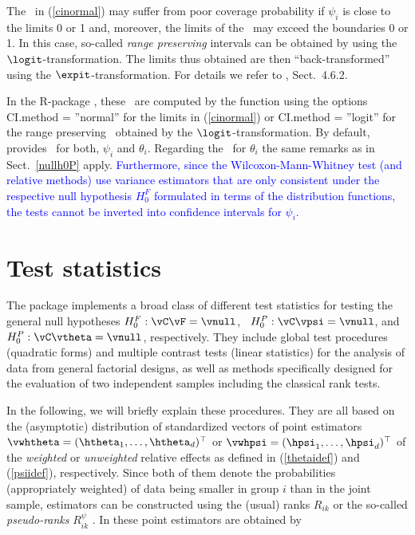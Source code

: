 The \cis\ in (\ref{cinormal}) may suffer from poor coverage probability if $\psi_i$ 
is close to the limits 0 or 1 and, moreover, the limits of the \ci\ may exceed 
the boundaries 0 or 1. In this case, so-called {\it range preserving} intervals 
can be obtained by using the $\logit$-transformation. The limits thus obtained 
are then ``back-transformed'' using the $\expit$-transformation. For details we 
refer to \cite{brunner2019rank}, Sect.~4.6.2.

In the R-package , these \cis\ are computed by the 
function  using the options CI.method = ''normal'' for the limits in 
(\ref{cinormal}) or CI.method = ''logit'' for the range preserving \cis\ 
obtained by the $\logit$-transformation. By default,  provides \cis\ for 
both, $\psi_i$ and $\theta_i$. Regarding the \cis\ for $\theta_i$ the 
same remarks as in Sect.~\ref{nullh0P} apply. \textcolor{blue}{Furthermore, since 
the Wilcoxon-Mann-Whitney test (and relative methods) use variance estimators that are only consistent under the
respective null hypothesis $H_0^F$ formulated in terms of the distribution functions, the tests cannot be inverted into confidence intervals for $\psi_i$.}



\section{Test statistics}\label{teststat}


The  package implements a broad class of different test statistics 
for testing the general null hypotheses $H_0^F: \vC \vF = \vnull$, \ $H_0^P: 
\vC \vpsi = \vnull$, and $H_0^P: \vC \vtheta = \vnull$, respectively. 
They include global test procedures (quadratic forms) and multiple contrast 
tests (linear statistics) for the analysis of data from general factorial 
designs, as well as methods specifically designed for the evaluation of two 
independent samples including the classical rank tests. 

In the following, we will briefly explain these procedures. They are all based 
on the (asymptotic) distribution of standardized vectors of point estimators 
$\vwhtheta = (\htheta_1, \ldots, \htheta_d)^\top$ or $\vwhpsi =(\hpsi_1, 
\ldots, \hpsi_d)^\top$ of the \textit{weighted}  or \textit{unweighted} 
relative effects as defined in (\ref{thetaidef}) and (\ref{psiidef}), 
respectively. Since both of them denote the probabilities (appropriately 
weighted) of data being smaller in group $i$ than in the joint sample, 
estimators can be constructed using the (usual) ranks $R_{ik}$ or the so-called 
\textit{pseudo-ranks} $R_{ik}^\psi$ \citep{happ2020pseudo}. 
In  these point estimators are obtained by 


